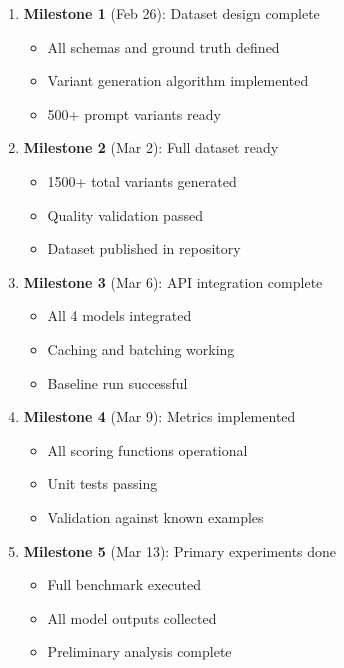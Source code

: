 \documentclass[11pt,a4paper]{article}
\begin{document}
\begin{enumerate}[leftmargin=*]
    \item \textbf{Milestone 1} (Feb 26): Dataset design complete
    \begin{itemize}
        \item All schemas and ground truth defined
        \item Variant generation algorithm implemented
        \item 500+ prompt variants ready
    \end{itemize}
    
    \item \textbf{Milestone 2} (Mar 2): Full dataset ready
    \begin{itemize}
        \item 1500+ total variants generated
        \item Quality validation passed
        \item Dataset published in repository
    \end{itemize}
    
    \item \textbf{Milestone 3} (Mar 6): API integration complete
    \begin{itemize}
        \item All 4 models integrated
        \item Caching and batching working
        \item Baseline run successful
    \end{itemize}
    
    \item \textbf{Milestone 4} (Mar 9): Metrics implemented
    \begin{itemize}
        \item All scoring functions operational
        \item Unit tests passing
        \item Validation against known examples
    \end{itemize}
    
    \item \textbf{Milestone 5} (Mar 13): Primary experiments done
    \begin{itemize}
        \item Full benchmark executed
        \item All model outputs collected
        \item Preliminary analysis complete
    \end{itemize}
    

\end{enumerate}
\end{document}
